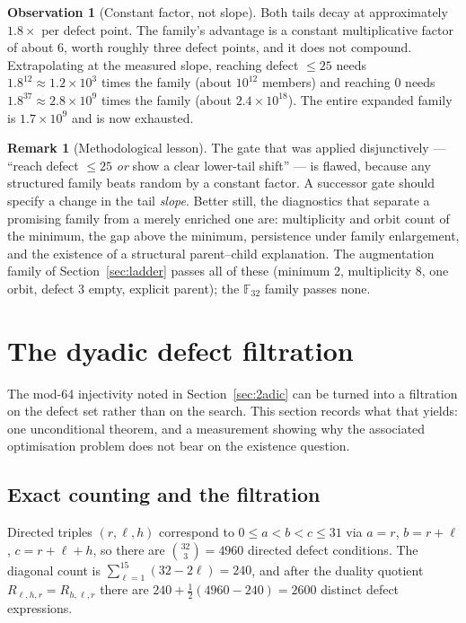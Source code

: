 \documentclass[11pt,a4paper]{article}
\theoremstyle{definition}
\newtheorem{remark}[theorem]{Remark}
\newtheorem{observation}[theorem]{Observation}
\newcommand{\F}{\mathbb{F}}
\begin{document}
\begin{observation}[Constant factor, not slope]
\label{obs:slope}
Both tails decay at approximately $1.8\times$ per defect point. The family's
advantage is a constant multiplicative factor of about 6, worth roughly three
defect points, and it does not compound. Extrapolating at the measured slope,
reaching defect $\le25$ needs $1.8^{12}\approx1.2\times10^3$ times the family
(about $10^{12}$ members) and reaching 0 needs $1.8^{37}\approx2.8\times10^9$
times the family (about $2.4\times10^{18}$). The entire expanded family is
$1.7\times10^9$ and is now exhausted.
\end{observation}

\begin{remark}[Methodological lesson]
The gate that was applied disjunctively --- ``reach defect $\le25$ \emph{or}
show a clear lower-tail shift'' --- is flawed, because any structured family
beats random by a constant factor. A successor gate should specify a change in
the tail \emph{slope}. Better still, the diagnostics that separate a promising
family from a merely enriched one are: multiplicity and orbit count of the
minimum, the gap above the minimum, persistence under family enlargement, and
the existence of a structural parent--child explanation. The augmentation family
of Section~\ref{sec:ladder} passes all of these (minimum 2, multiplicity 8, one
orbit, defect 3 empty, explicit parent); the $\F_{32}$ family passes none.
\end{remark}


\section{The dyadic defect filtration}
\label{sec:dyadic}

The mod-64 injectivity noted in Section~\ref{sec:2adic} can be turned into a
filtration on the defect set rather than on the search. This section records what
that yields: one unconditional theorem, and a measurement showing why the
associated optimisation problem does not bear on the existence question.

\subsection{Exact counting and the filtration}

Directed triples $(r,\ell,h)$ correspond to $0\le a<b<c\le31$ via $a=r$,
$b=r+\ell$, $c=r+\ell+h$, so there are $\binom{32}{3}=4960$ directed defect
conditions. The diagonal count is $\sum_{\ell=1}^{15}(32-2\ell)=240$, and after
the duality quotient $R_{\ell,h,r}=R_{h,\ell,r}$ there are
$240+\tfrac12(4960-240)=2600$ distinct defect expressions.
\end{document}
